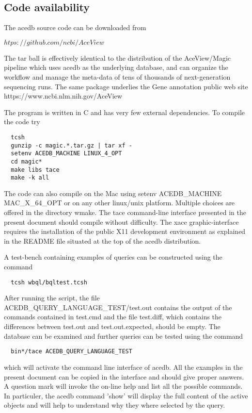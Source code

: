 \documentclass[11pt]{article}
\newcommand{\BL}{\begin{lstlisting}}
\begin{document}
%%%%%%%%%%%%%%%%%%%%%%%%%%%%%%%%%%%%%%%%%%%%%%%%%%%%%%%%%%%%%%%%
% SECTION
%%%%%%%%%%%%%%%%%%%%%%%%%%%%%%%%%%%%%%%%%%%%%%%%%%%%%%%%%%%%%%%%
\subsection {Code availability}

The acedb source code can be downloaded from 
 
$htps://github.com/ncbi/AceView$

The tar ball is effectively identical to the distribution of the AceView/Magic pipeline 
\cite{DJTM} which uses acedb as the underlying database, and can organize the workflow and manage the
meta-data of tens of thousands of next-generation sequencing runs. The same package
underlies the Gene annotation public web site https://www.ncbi.nlm.nih.gov/AceView \cite{cDNA}

The program is written in C and has very few external dependencies. To compile the code try
\BL
  tcsh 
  gunzip -c magic.*.tar.gz | tar xf -
  setenv ACEDB_MACHINE LINUX_4_OPT
  cd magic*
  make libs tace
  make -k all
\end{lstlisting}
 
The code can also compile on the Mac using 
setenv ACEDB\_MACHINE  MAC\_X\_64\_OPT
or on any other linux/unix platform. Multiple choices are offered in the directory wmake.
The tace command-line interface presented in the present document
should compile without difficulty.
The xace graphic-interface requires 
the installation of the public X11 development environment
as explained in the README file situated at the top of the acedb distribution.

A test-bench containing examples of queries can be constructed
using the command
\BL
  tcsh wbql/bqltest.tcsh
\end{lstlisting}
After running the script, 
the file ACEDB\_QUERY\_LANGUAGE\_TEST/test.out contains the output of
the commands contained in test.cmd and the file test.diff,
which contains the differences between test.out and test.out.expected, should be empty.
The database can be examined and
further queries can be tested using the command
\BL
  bin*/tace ACEDB_QUERY_LANGUAGE_TEST
\end{lstlisting}
which will activate the command line interface of acedb. All the examples
in the present document can be copied in the interface and
should give proper answers. A question mark will invoke
the on-line help and list all the possible commands.
In particuler, the acedb command 'show' will display
the full content of the active objects and will help to understand why 
they where selected by the query. 
\end{document}
